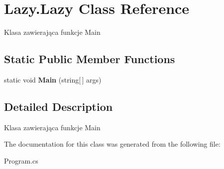 \hypertarget{class_lazy_1_1_lazy}{}\section{Lazy.\+Lazy Class Reference}
\label{class_lazy_1_1_lazy}


Klasa zawierająca funkcje Main  


\subsection*{Static Public Member Functions}
\begin{DoxyCompactItemize}
\item 
\mbox{\label{class_lazy_1_1_lazy_a7537c807bb66d6f0417a539c831a2c7d}} 
static void {\bfseries Main} (string\mbox{[}$\,$\mbox{]} args)
\end{DoxyCompactItemize}


\subsection{Detailed Description}
Klasa zawierająca funkcje Main 



The documentation for this class was generated from the following file\+:\begin{DoxyCompactItemize}
\item 
Program.\+cs\end{DoxyCompactItemize}
